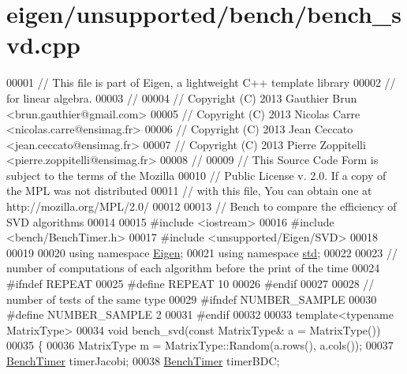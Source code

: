\hypertarget{eigen_2unsupported_2bench_2bench__svd_8cpp_source}{}\section{eigen/unsupported/bench/bench\+\_\+svd.cpp}
\label{eigen_2unsupported_2bench_2bench__svd_8cpp_source}

\begin{DoxyCode}
00001 \textcolor{comment}{// This file is part of Eigen, a lightweight C++ template library}
00002 \textcolor{comment}{// for linear algebra.}
00003 \textcolor{comment}{//}
00004 \textcolor{comment}{// Copyright (C) 2013 Gauthier Brun <brun.gauthier@gmail.com>}
00005 \textcolor{comment}{// Copyright (C) 2013 Nicolas Carre <nicolas.carre@ensimag.fr>}
00006 \textcolor{comment}{// Copyright (C) 2013 Jean Ceccato <jean.ceccato@ensimag.fr>}
00007 \textcolor{comment}{// Copyright (C) 2013 Pierre Zoppitelli <pierre.zoppitelli@ensimag.fr>}
00008 \textcolor{comment}{//}
00009 \textcolor{comment}{// This Source Code Form is subject to the terms of the Mozilla}
00010 \textcolor{comment}{// Public License v. 2.0. If a copy of the MPL was not distributed}
00011 \textcolor{comment}{// with this file, You can obtain one at http://mozilla.org/MPL/2.0/}
00012 
00013 \textcolor{comment}{// Bench to compare the efficiency of SVD algorithms}
00014 
00015 \textcolor{preprocessor}{#include <iostream>}
00016 \textcolor{preprocessor}{#include <bench/BenchTimer.h>}
00017 \textcolor{preprocessor}{#include <unsupported/Eigen/SVD>}
00018 
00019 
00020 \textcolor{keyword}{using namespace }\hyperlink{namespace_eigen}{Eigen};
00021 \textcolor{keyword}{using namespace }\hyperlink{namespacestd}{std};
00022 
00023 \textcolor{comment}{// number of computations of each algorithm before the print of the time}
00024 \textcolor{preprocessor}{#ifndef REPEAT}
00025 \textcolor{preprocessor}{#define REPEAT 10}
00026 \textcolor{preprocessor}{#endif}
00027 
00028 \textcolor{comment}{// number of tests of the same type}
00029 \textcolor{preprocessor}{#ifndef NUMBER\_SAMPLE}
00030 \textcolor{preprocessor}{#define NUMBER\_SAMPLE 2}
00031 \textcolor{preprocessor}{#endif}
00032 
00033 \textcolor{keyword}{template}<\textcolor{keyword}{typename} MatrixType>
00034 \textcolor{keywordtype}{void} bench\_svd(\textcolor{keyword}{const} MatrixType& a = MatrixType())
00035 \{
00036   MatrixType m = MatrixType::Random(a.rows(), a.cols());
00037   \hyperlink{class_eigen_1_1_bench_timer}{BenchTimer} timerJacobi;
00038   \hyperlink{class_eigen_1_1_bench_timer}{BenchTimer} timerBDC;

\end{DoxyCode}
